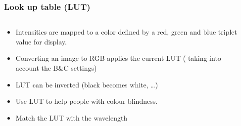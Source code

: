 \documentclass[ignorenonframetext,aspectratio=169,10pt,xcolor=table]{beamer}
\begin{document}
\begin{frame} \frametitle{Look up table (LUT)}
  \begin{columns}
    \begin{column}{0.6\textwidth}
      \begin{itemize}
      \item Intensities are mapped to a color defined by a red, green
        and blue triplet value for display.
      \item Converting an image to RGB applies the current LUT
        ( taking into account the B\&C settings)
      \item LUT can be inverted (black becomes white, \dots)
      \item Use LUT to help people with colour blindness.
      \item Match the LUT with the wavelength
      \end{itemize}
    \end{column}
    \begin{column}{0.4\textwidth}
      \begin{center}
      \end{center}
    \end{column}
  \end{columns}
\end{frame}
\end{document}
